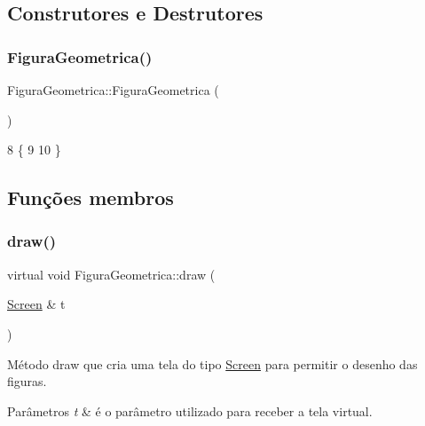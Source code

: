 \subsection{Construtores e Destrutores}
\mbox{\label{class_figura_geometrica_a81d7c7efaea511e60a15f5a363138dd9}} 
\subsubsection{\texorpdfstring{Figura\+Geometrica()}{FiguraGeometrica()}}
{\footnotesize\ttfamily Figura\+Geometrica\+::\+Figura\+Geometrica (\begin{DoxyParamCaption}{ }\end{DoxyParamCaption})}


\begin{DoxyCode}
8 \{
9 
10 \}
\end{DoxyCode}


\subsection{Funções membros}
\mbox{\label{class_figura_geometrica_a8ee8dedc060b6059a805ea091aef2c41}} 
\subsubsection{\texorpdfstring{draw()}{draw()}}
{\footnotesize\ttfamily virtual void Figura\+Geometrica\+::draw (\begin{DoxyParamCaption}\item[{\mbox{\hyperlink{class_screen}{Screen}} \&}]{t }\end{DoxyParamCaption})\hspace{0.3cm}{\ttfamily [pure virtual]}}



Método draw que cria uma tela do tipo \mbox{\hyperlink{class_screen}{Screen}} para permitir o desenho das figuras. 


\begin{DoxyParams}{Parâmetros}
{\em t} & é o parâmetro utilizado para receber a tela virtual. \\
\hline
\end{DoxyParams}


